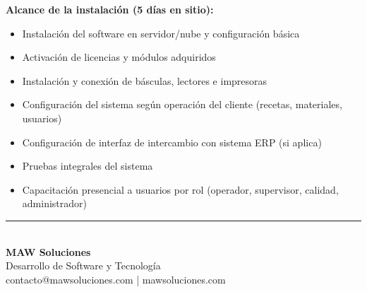 \documentclass[11pt]{article}
\begin{document}
\vspace{10pt}

\begin{cajaNota}
\footnotesize
\textbf{Alcance de la instalación (5 días en sitio):}
\begin{itemize}[nosep]
    \item Instalación del software en servidor/nube y configuración básica
    \item Activación de licencias y módulos adquiridos
    \item Instalación y conexión de básculas, lectores e impresoras
    \item Configuración del sistema según operación del cliente (recetas, materiales, usuarios)
    \item Configuración de interfaz de intercambio con sistema ERP (si aplica)
    \item Pruebas integrales del sistema
    \item Capacitación presencial a usuarios por rol (operador, supervisor, calidad, administrador)
\end{itemize}
\end{cajaNota}

\vfill
\begin{center}
{\color{pharmaazul}\rule{0.4\linewidth}{1.2pt}}\\[10pt]
{\large\bfseries\color{tinta}MAW Soluciones}\\[4pt]
{\normalsize\color{gristexto}Desarrollo de Software y Tecnología}\\[4pt]
{\footnotesize\color{gristexto}contacto@mawsoluciones.com | mawsoluciones.com}
\end{center}
\end{document}
